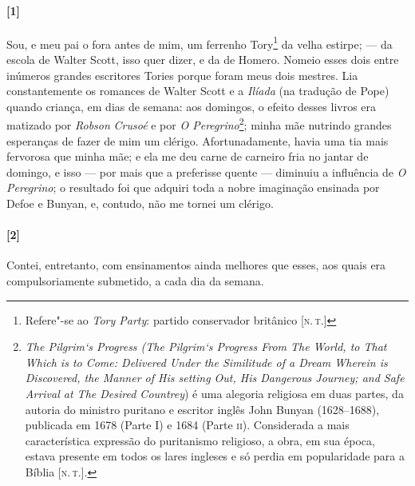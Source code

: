
\paragraph{[1]} Sou, e meu pai o fora antes de mim, um ferrenho Tory\footnote{Refere"-se
  ao \emph{Tory Party}: partido conservador britânico {[}\textsc{n.\,t.}{]}} da
velha estirpe; --- da escola de Walter Scott, isso quer dizer, e da de
Homero. Nomeio esses dois entre inúmeros grandes escritores Tories
porque foram meus dois mestres. Lia constantemente os romances de Walter
Scott e a \emph{Ilíada} (na tradução de Pope) quando criança, em dias de
semana: aos domingos, o efeito desses livros era matizado por
\emph{Robson} \emph{Crusoé} e por \emph{O Peregrino}\footnote{\emph{The
  Pilgrim`s Progress (The Pilgrim`s Progress From The World, to That
  Which is to Come: Delivered Under the Similitude of a Dream Wherein is
  Discovered, the Manner of His setting Out, His Dangerous Journey; and
  Safe Arrival at The Desired Countrey}) é uma alegoria religiosa em
  duas partes, da autoria do ministro puritano e escritor inglês John
  Bunyan (1628--1688), publicada em 1678 (Parte I) e 1684 (Parte \textsc{ii}).
  Considerada a mais característica expressão do puritanismo religioso,
  a obra, em sua época, estava presente em todos os lares ingleses e só
  perdia em popularidade para a Bíblia {[}\textsc{n.\,t.}{]}.}; minha mãe
nutrindo grandes esperanças de fazer de mim um clérigo. Afortunadamente,
havia uma tia mais fervorosa que minha mãe; e ela me deu carne de
carneiro fria no jantar de domingo, e isso --- por mais que a preferisse
quente --- diminuiu a influência de \emph{O Peregrino}; o resultado foi
que adquiri toda a nobre imaginação ensinada por Defoe e Bunyan, e,
contudo, não me tornei um clérigo.

\paragraph{[2]} Contei, entretanto, com ensinamentos ainda melhores que esses, aos
quais era compulsoriamente submetido, a cada dia da semana.

